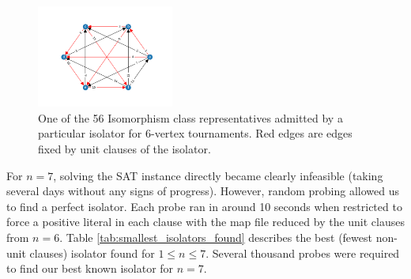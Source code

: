 \documentclass[conference]{IEEEtran}
\begin{document}


\begin{figure}
\centering
\includegraphics[width=0.4\textwidth]{iso6.png}
\caption{One of the 56 Isomorphism class representatives admitted by a particular isolator for 6-vertex tournaments. Red edges are edges fixed by unit clauses of the isolator.} \label{fig3}
\end{figure}


 For $n = 7$, solving the SAT instance directly became clearly infeasible (taking several days without any signs of progress). However, random probing allowed us to find a perfect isolator. Each probe ran in around 10 seconds when restricted to force a positive literal in each clause with the map file reduced by the unit clauses from $n=6$.  Table \ref{tab:smallest_isolators_found} describes the best (fewest non-unit clauses) isolator found for $1 \le n \le 7$. Several thousand probes were required to find our best known isolator for $n=7$.
\end{document}
